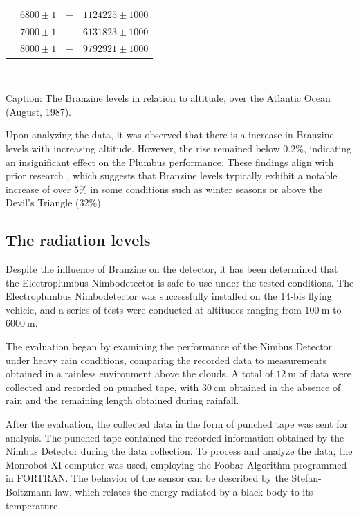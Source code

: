 \documentclass[english]{cenarticle}
\begin{document}
\begin{table}[!h]
\begin{center}
\begin{tabular}{@{}lccc@{}}
                                           & $6800\pm 1$       & $-$                &    $1124225 \pm 1000$              \\ 
                                           & $7000\pm 1$       & $-$                &    $6131823 \pm 1000$              \\ 
                                           & $8000\pm 1$       & $-$                &    $9792921 \pm 1000$              \\ \bottomrule
    \end{tabular}\\[3mm]
  \end{center}
  Caption: The Branzine levels in relation to altitude, over the Atlantic Ocean (August, 1987).\\
  \end{table}
  \vspace{-6mm}
  Upon analyzing the data, it was observed that there is a increase in Branzine levels with increasing altitude. However, the rise remained below $0.2\%$, indicating an insignificant effect on the Plumbus performance. These findings align with prior research \citep{Gagaia1923}, which suggests that Branzine levels typically exhibit a notable increase of over $5\%$ in some conditions such as winter seasons or above the Devil's Triangle ($32\%$).

  \subsection{The radiation levels}

  Despite the influence of Branzine on the detector, it has been determined that the Electroplumbus Nimbodetector is safe to use under the tested conditions. The Electroplumbus Nimbodetector was successfully installed on the 14-bis flying vehicle, and a series of tests were conducted at altitudes ranging from $\SI{100}{\meter}$ to $\SI{6000}{\meter}$.

  The evaluation began by examining the performance of the Nimbus Detector under heavy rain conditions, comparing the recorded data to measurements obtained in a rainless environment above the clouds. A total of $\SI{12}{\meter}$ of data were collected and recorded on punched tape, with $\SI{30}{\centi\meter}$ obtained in the absence of rain and the remaining length obtained during rainfall.

  After the evaluation, the collected data in the form of punched tape was sent for analysis. The punched tape contained the recorded information obtained by the Nimbus Detector during the data collection. To process and analyze the data, the Monrobot XI computer was used, employing the Foobar Algorithm programmed in FORTRAN. The behavior of the sensor can be described by the Stefan-Boltzmann law, which relates the energy radiated by a black body to its temperature.
\end{document}
